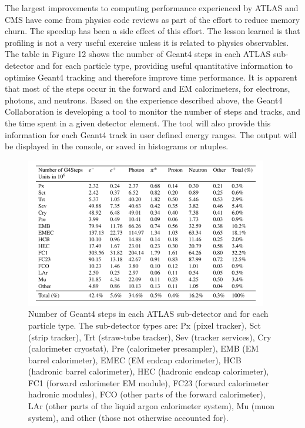 \documentclass[12pt,a4paper]{article}
\begin{document}
{The largest improvements to computing performance experienced by ATLAS
and CMS have come from physics code reviews as part of the effort to
reduce memory churn. The speedup has been a side effect of this effort.
The lesson learned is that profiling is not a very useful exercise
unless it is related to physics observables. The table in Figure 12
shows the number of Geant4 steps in each ATLAS sub-detector and for each
particle type, providing useful quantitative information to optimise
Geant4 tracking and therefore improve time performance. It is apparent
that most of the steps occur in the forward and EM calorimeters, for
electrons, photons, and neutrons. Based on the experience described
above, the Geant4 Collaboration is developing a tool to monitor the
number of steps and tracks, and the time spent in a given detector
element. The tool will also provide this information for each Geant4
track in user defined energy ranges. The output will be displayed in the
console, or saved in histograms or ntuples.

\begin{figure}[bthp]
\vspace*{0.3cm}
\centering
\includegraphics[width=0.94\textwidth]{image12.png}
\caption{Number of Geant4 steps in each ATLAS sub-detector and
for each particle type. The sub-detector types are: Px (pixel tracker),
Sct (strip tracker), Trt (straw-tube tracker), Sev (tracker services),
Cry (calorimeter cryostat), Pre (calorimeter presampler), EMB (EM barrel
calorimeter), EMEC (EM endcap calorimeter), HCB (hadronic barrel
calorimeter), HEC (hadronic endcap calorimeter), FC1 (forward
calorimeter EM module), FC23 (forward calorimeter hadronic modules), FCO
(other parts of the forward calorimeter), LAr (other parts of the liquid
argon calorimeter system), Mu (muon system), and other (those not
otherwise accounted for).}
\label{fig:perfsteps}
\end{figure}

}
\end{document}
